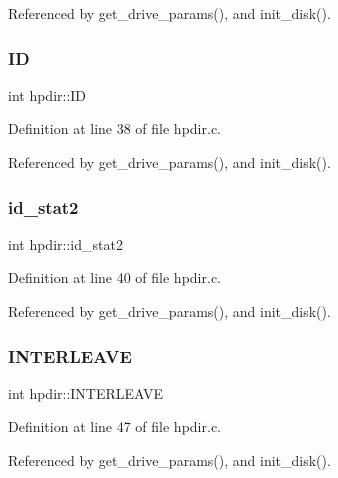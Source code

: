 Referenced by get\+\_\+drive\+\_\+params(), and init\+\_\+disk().

\mbox{\label{structhpdir_a17f3f4abd99f31186f6b7e308e4f097c}} 
\subsubsection{\texorpdfstring{ID}{ID}}
{\footnotesize\ttfamily int hpdir\+::\+ID}



Definition at line 38 of file hpdir.\+c.



Referenced by get\+\_\+drive\+\_\+params(), and init\+\_\+disk().

\mbox{\label{structhpdir_a319e6d592ed85b0bdd369210b328a6f8}} 
\subsubsection{\texorpdfstring{id\+\_\+stat2}{id\_stat2}}
{\footnotesize\ttfamily int hpdir\+::id\+\_\+stat2}



Definition at line 40 of file hpdir.\+c.



Referenced by get\+\_\+drive\+\_\+params(), and init\+\_\+disk().

\mbox{\label{structhpdir_a5fde4c6a05645b1cd7311eff6536b986}} 
\subsubsection{\texorpdfstring{I\+N\+T\+E\+R\+L\+E\+A\+VE}{INTERLEAVE}}
{\footnotesize\ttfamily int hpdir\+::\+I\+N\+T\+E\+R\+L\+E\+A\+VE}



Definition at line 47 of file hpdir.\+c.



Referenced by get\+\_\+drive\+\_\+params(), and init\+\_\+disk().

\mbox{\label{structhpdir_ac66d8e5f5e632401c762a0698128dfdf}} 

